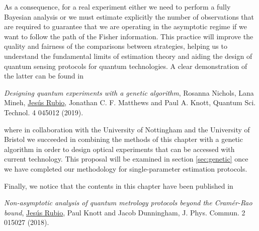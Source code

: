 As a consequence, for a real experiment either we need to perform a fully Bayesian analysis or we must estimate explicitly the number of observations that are required to guarantee that we are operating in the asymptotic regime if we want to follow the path of the Fisher information. This practice will improve the quality and fairness of the comparisons between strategies, helping us to understand the fundamental limits of estimation theory and aiding the design of quantum sensing protocols for quantum technologies. A clear demonstration of the latter can be found in \cite{jesus2018dec}
\begin{displayquote}
\emph{Designing quantum experiments with a genetic algorithm}, Rosanna Nichols, Lana Mineh, \underline{Jes\'{u}s Rubio}, Jonathan C. F. Matthews and Paul A. Knott, Quantum Sci. Technol. 4 045012 (2019).
\end{displayquote}
where in collaboration with the University of Nottingham and the University of Bristol we succeeded in combining the methods of this chapter with a genetic algorithm in order to design optical experiments that can be accessed with current technology. This proposal will be examined in section \ref{sec:genetic} once we have completed our methodology for single-parameter estimation protocols. 

Finally, we notice that the contents in this chapter have been published in \cite{jesus2017}
\begin{displayquote}
\emph{Non-asymptotic analysis of quantum metrology protocols beyond the Cram\'{e}r-Rao bound}, \underline{Jes\'{u}s Rubio}, Paul Knott and Jacob Dunningham, J. Phys. Commun. 2 015027 (2018).
\end{displayquote}
